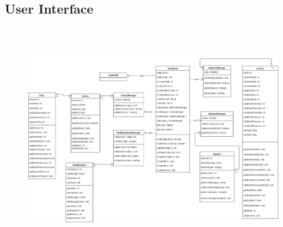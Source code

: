 \subsection{User Interface}
\begin{center}
\begin{figure}[h]
	\includegraphics[width=15cm, height=10cm]{Interface.PNG}
\end{figure}
\end{center}

